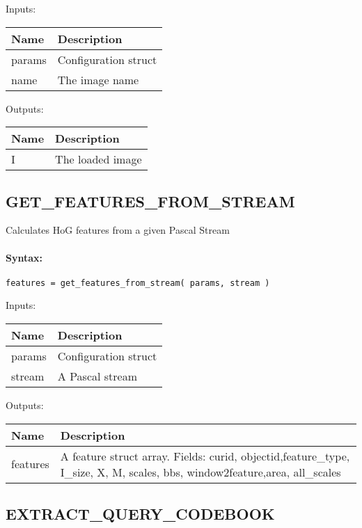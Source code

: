 \bigskip
Inputs:

\begin{tabular}{|p{}|p{}|}
\hline
\textbf{Name} & \textbf{Description} \\
\hline \hline
params & Configuration struct  \\ \hline
name & The image name  \\ \hline
\end{tabular}

\bigskip
Outputs:

\begin{tabular}{|p{}|p{}|}
\hline
\textbf{Name} & \textbf{Description} \\
\hline \hline
I & The loaded image  \\ \hline
\end{tabular}

\subsection{GET\_FEATURES\_FROM\_STREAM}

Calculates HoG features from a given Pascal Stream

\paragraph{Syntax:} \verb|features = get_features_from_stream( params, stream )|

\bigskip
Inputs:

\begin{tabular}{|p{}|p{}|}
\hline
\textbf{Name} & \textbf{Description} \\
\hline \hline
params & Configuration struct  \\ \hline
stream & A Pascal stream  \\ \hline
\end{tabular}

\bigskip
Outputs:

\begin{tabular}{|p{}|p{}|}
\hline
\textbf{Name} & \textbf{Description} \\
\hline \hline
features & A feature struct array. Fields: curid, objectid,feature\_type, I\_size, X, M, scales, bbs, window2feature,area, all\_scales  \\ \hline
\end{tabular}

\subsection{EXTRACT\_QUERY\_CODEBOOK}

